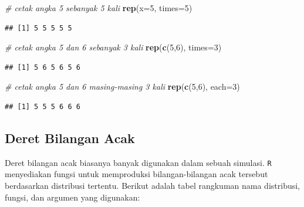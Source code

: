 \documentclass[]{book}
\newenvironment{Shaded}{\begin{snugshade}}{\end{snugshade}}
\newcommand{\CommentTok}[1]{\textcolor[rgb]{0.56,0.35,0.01}{\textit{#1}}}
\newcommand{\DataTypeTok}[1]{\textcolor[rgb]{0.13,0.29,0.53}{#1}}
\newcommand{\DecValTok}[1]{\textcolor[rgb]{0.00,0.00,0.81}{#1}}
\newcommand{\KeywordTok}[1]{\textcolor[rgb]{0.13,0.29,0.53}{\textbf{#1}}}
\newcommand{\NormalTok}[1]{#1}
\theoremstyle{definition}
\theoremstyle{definition}
\theoremstyle{definition}
\theoremstyle{remark}
\begin{document}
\begin{Shaded}
\begin{Highlighting}[]
\CommentTok{# cetak angka 5 sebanyak 5 kali}
\KeywordTok{rep}\NormalTok{(}\DataTypeTok{x=}\DecValTok{5}\NormalTok{, }\DataTypeTok{times=}\DecValTok{5}\NormalTok{)}
\end{Highlighting}
\end{Shaded}

\begin{verbatim}
## [1] 5 5 5 5 5
\end{verbatim}

\begin{Shaded}
\begin{Highlighting}[]
\CommentTok{# cetak angka 5 dan 6 sebanyak 3 kali}
\KeywordTok{rep}\NormalTok{(}\KeywordTok{c}\NormalTok{(}\DecValTok{5}\NormalTok{,}\DecValTok{6}\NormalTok{), }\DataTypeTok{times=}\DecValTok{3}\NormalTok{)}
\end{Highlighting}
\end{Shaded}

\begin{verbatim}
## [1] 5 6 5 6 5 6
\end{verbatim}

\begin{Shaded}
\begin{Highlighting}[]
\CommentTok{# cetak angka 5 dan 6 masing-masing 3 kali}
\KeywordTok{rep}\NormalTok{(}\KeywordTok{c}\NormalTok{(}\DecValTok{5}\NormalTok{,}\DecValTok{6}\NormalTok{), }\DataTypeTok{each=}\DecValTok{3}\NormalTok{)}
\end{Highlighting}
\end{Shaded}

\begin{verbatim}
## [1] 5 5 5 6 6 6
\end{verbatim}

\hypertarget{randnumb}{%
\subsection{Deret Bilangan Acak}\label{randnumb}}

Deret bilangan acak biasanya banyak digunakan dalam sebuah simulasi. \texttt{R} menyediakan fungsi untuk memproduksi bilangan-bilangan acak tersebut berdasarkan distribusi tertentu. Berikut adalah tabel rangkuman nama distribusi, fungsi, dan argumen yang digunakan:
\end{document}

